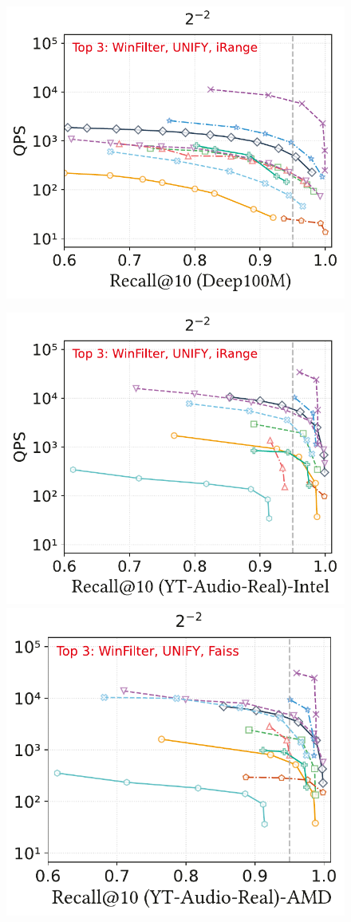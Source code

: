 \documentclass[sigconf, nonacm, pdfa]{acmart}
\begin{document}
{\begin{figure}
\begin{minipage}[t]{0.36\textwidth}
	\end{minipage}
	\hfill
	\begin{minipage}[t]{0.18\textwidth}
		\centering
		\includegraphics[width=0.96\linewidth]{figures/exp/range_deep100M.pdf} 
	\end{minipage}
	\hfill %
	\begin{minipage}[t]{0.36\textwidth}
		\centering
		\includegraphics[width=0.495\linewidth]{figures/exp/range_85.pdf}
		\hfill
		\includegraphics[width=0.47\linewidth]{figures/exp/range_71.pdf}
	\end{minipage}
\end{figure}

}
\end{document}
